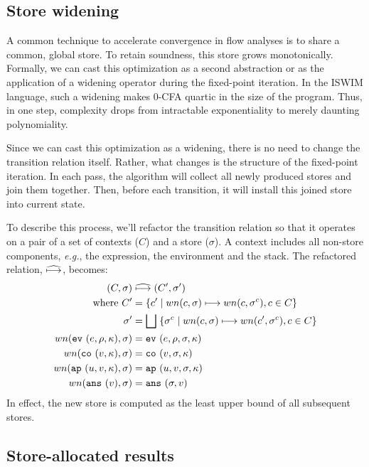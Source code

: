 \documentclass[preprint,onecolumn,9pt]{sigplanconf} %
\begin{document}
\subsection{Store widening}
\label{sec:storewiden}

A common technique to accelerate convergence in flow analyses is to share a
common, global store.
%
To retain soundness, this store grows monotonically.
%
Formally, we can cast this optimization as a second abstraction or as the
application of a widening operator during the fixed-point iteration.
%
In the ISWIM language, such a widening makes 0-CFA quartic in the size of the
program.
%
Thus, in one step, complexity drops from intractable exponentiality to merely
daunting polynomiality.

Since we can cast this optimization as a widening, there is no need to change
the transition relation itself.
%
Rather, what changes is the structure of the fixed-point iteration.
%
In each pass, the algorithm will collect all newly produced stores and join
them together.
%
Then, before each transition, it will install this joined store into current
state.

To describe this process, we'll refactor the transition relation so that it operates on
a pair of a set of contexts ($C$) and a store ($\sigma$).
%
A context includes all non-store components, \emph{e.g.}, the expression, the environment and the stack.
%
The refactored relation, $\widehat{\longmapsto}$, becomes:
%
\begin{align*}
(C, \sigma) &\mathrel{\widehat{\longmapsto}} (C', \sigma') \\
\mbox{where } C' &= \{c' \mid wn(c, \sigma) \mathrel{\longmapsto} wn(c, \sigma^c), c \in C\} \\
              \sigma' &= \bigsqcup\; \{\sigma^c \mid wn(c,\sigma)\mathrel{\longmapsto} wn(c', \sigma^c), c \in C\} \\
wn({\tt ev{\ }}({e, \rho, \kappa}), \sigma) &= {\tt ev{\ }}({e, \rho, \sigma, \kappa}) \\
wn({\tt co{\ }}({v, \kappa}), \sigma) &= {\tt co{\ }}({v, \sigma, \kappa}) \\
wn({\tt ap{\ }}({u, v, \kappa}), \sigma) &= {\tt ap{\ }}({u, v, \sigma, \kappa}) \\
wn({\tt ans{\ }}({v}), \sigma) &= {\tt ans{\ }}({\sigma, v})
\end{align*}
%
In effect, the new store is computed as the least upper bound of all subsequent stores.


\subsection{Store-allocated results}
\label{sec:baselineeval}
\end{document}
